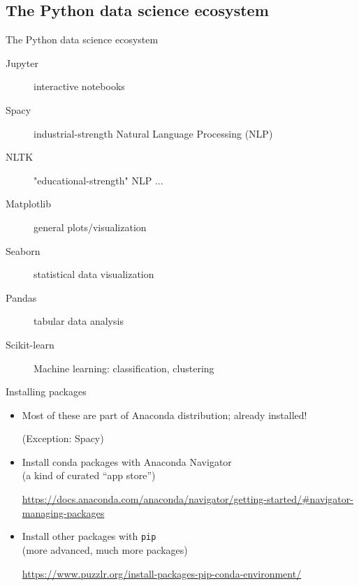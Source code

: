 \documentclass[aspectratio=169,usenames,dvipsnames]{beamer}
\begin{document}
\subsection{The Python data science ecosystem}
\begin{frame}[fragile]{The Python data science ecosystem}
    \begin{description}
        \item[Jupyter] interactive notebooks
        \item[Spacy] industrial-strength Natural Language Processing (NLP)
        \item[NLTK] "educational-strength" NLP ...
        \item[Matplotlib] general plots/visualization
        \item[Seaborn] statistical data visualization
        \item[Pandas] tabular data analysis
        \item[Scikit-learn] Machine learning: classification, clustering
    \end{description}
\end{frame}

\begin{frame}{Installing packages}
    \begin{itemize}
        \item Most of these are part of Anaconda distribution; already installed!

            (Exception: Spacy) %
        \item Install conda packages with Anaconda Navigator \\
			(a kind of curated ``app store'')

            \url{https://docs.anaconda.com/anaconda/navigator/getting-started/\#navigator-managing-packages}

        \item Install other packages with \texttt{pip} \\
			(more advanced, much more packages)

            \url{https://www.puzzlr.org/install-packages-pip-conda-environment/}
    \end{itemize}
\end{frame}
\end{document}
